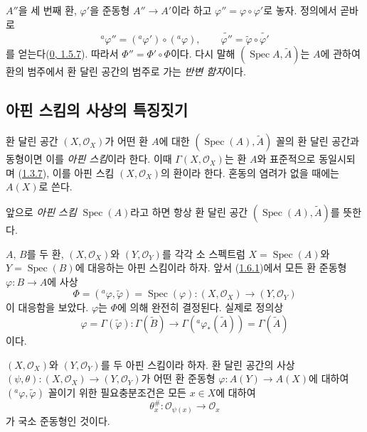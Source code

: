 \begin{env}[1.6.10]
\label{I.1.6.10-ko}
$A''$을 세 번째 환, $\varphi'$을 준동형 $A''\to A'$이라 하고
$\varphi''=\varphi\circ\varphi'$로 놓자. 정의에서 곧바로
\[
  {}^a\varphi''=({}^a\varphi')\circ({}^a\varphi),
  \qquad
  \widetilde{\varphi''}=\widetilde\varphi\circ\widetilde{\varphi'}
\]
를 얻는다(\hyperref[0.1.5.7-ko]{0, 1.5.7}). 따라서
$\Phi''=\Phi'\circ\Phi$이다. 다시 말해
$(\operatorname{Spec}A,\widetilde A)$는 $A$에 관하여 환의 범주에서
환 달린 공간의 범주로 가는 \emph{반변 함자}이다.
\end{env}

\subsection{아핀 스킴의 사상의 특징짓기}
\label{subsection:I.1.7-ko}

\begin{definition}[1.7.1]
\label{I.1.7.1-ko}
환 달린 공간 $(X,\mathscr{O}_X)$가 어떤 환 $A$에 대한
$(\operatorname{Spec}(A),\widetilde A)$ 꼴의 환 달린 공간과 동형이면
이를 \emph{아핀 스킴}이라 한다. 이때 $\Gamma(X,\mathscr{O}_X)$는
환 $A$와 표준적으로 동일시되며
(\hyperref[I.1.3.7-ko]{1.3.7}), 이를 아핀 스킴
$(X,\mathscr{O}_X)$의 환이라 한다. 혼동의 염려가 없을 때에는
$A(X)$로 쓴다.
\end{definition}

앞으로 \emph{아핀 스킴} $\operatorname{Spec}(A)$라고 하면 항상 환 달린
공간 $(\operatorname{Spec}(A),\widetilde A)$를 뜻한다.

\begin{env}[1.7.2]
\label{I.1.7.2-ko}
$A$, $B$를 두 환, $(X,\mathscr{O}_X)$와 $(Y,\mathscr{O}_Y)$를 각각
소 스펙트럼 $X=\operatorname{Spec}(A)$와 $Y=\operatorname{Spec}(B)$에
대응하는 아핀 스킴이라 하자. 앞서
(\hyperref[I.1.6.1-ko]{1.6.1})에서 모든 환 준동형
$\varphi:B\to A$에 사상
\[
  \Phi=({}^a\varphi,\widetilde\varphi)
  =\operatorname{Spec}(\varphi):
  (X,\mathscr{O}_X)\to(Y,\mathscr{O}_Y)
\]
이 대응함을 보았다. $\varphi$는 $\Phi$에 의해 완전히 결정된다. 실제로
정의상
\[
  \varphi=\Gamma(\widetilde\varphi):
  \Gamma(\widetilde B)\longrightarrow
  \Gamma({}^a\varphi_*(\widetilde A))=\Gamma(\widetilde A)
\]
이다.
\end{env}

\begin{theorem}[1.7.3]
\label{I.1.7.3-ko}
$(X,\mathscr{O}_X)$와 $(Y,\mathscr{O}_Y)$를 두 아핀 스킴이라 하자.
환 달린 공간의 사상
$(\psi,\theta):(X,\mathscr{O}_X)\to(Y,\mathscr{O}_Y)$가 어떤 환 준동형
$\varphi:A(Y)\to A(X)$에 대하여
$({}^a\varphi,\widetilde\varphi)$ 꼴이기 위한 필요충분조건은 모든
$x\in X$에 대하여
\[
  \theta_x^{\#}:\mathscr{O}_{\psi(x)}\to\mathscr{O}_x
\]
가 국소 준동형인 것이다.
\end{theorem}

